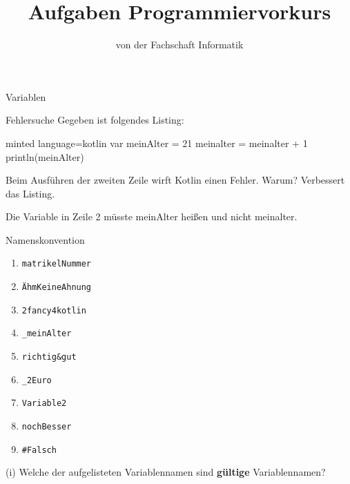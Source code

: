 
\title{Aufgaben Programmiervorkurs}
\subtitle{von der Fachschaft Informatik\hfill\ptitle}

\usepackage{enumitem}


\maketitle{}

\begin{task}[points=auto]{Variablen }
    \begin{subtask*}[points=0]{Fehlersuche}
        Gegeben ist folgendes Listing:
        \begin{codeBlock}[]{minted language=kotlin}
            var meinAlter = 21
            meinalter = meinalter + 1
            println(meinAlter)
        \end{codeBlock}
        Beim Ausführen der zweiten Zeile wirft Kotlin einen Fehler. Warum? Verbessert das Listing.
        \begin{solution}
            Die Variable in Zeile 2 müsste {\ttfamily meinAlter} heißen und nicht {\ttfamily meinalter}.
        \end{solution}
    \end{subtask*}
    \begin{subtask*}[points=0]{Namenskonvention}
        \begin{multicols}{3}
            \begin{enumerate}[label=(\alph*)]
                \item \texttt{matrikelNummer}
                \item \texttt{ÄhmKeineAhnung}
                \item \texttt{2fancy4kotlin}
                \item \texttt{_meinAlter}
                \item \texttt{richtig&gut}
                \item \texttt{_2Euro}
                \item \texttt{Variable2}
                \item \texttt{nochBesser}
                \item \texttt{#Falsch}
            \end{enumerate}
        \end{multicols}
        (i) Welche der aufgelisteten Variablennamen sind \textbf{gültige} Variablennamen?


\end{subtask*}
\end{task}
